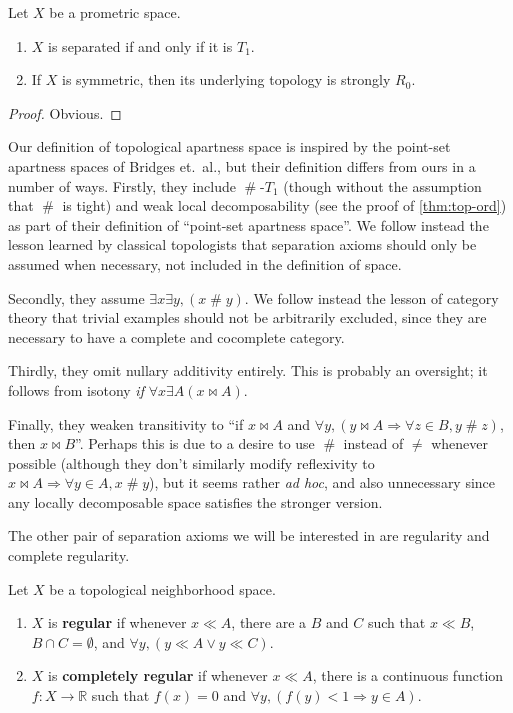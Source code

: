 \documentclass{article}
\def\R{\mathbb{R}}
\def\apart{\mathrel{\#}}
\let\implies\Rightarrow
\begin{document}
\begin{thm}
  Let $X$ be a prometric space.
  \begin{enumerate}
  \item $X$ is separated if and only if it is $T_1$.
  \item If $X$ is symmetric, then its underlying topology is strongly $R_0$.
  \end{enumerate}
\end{thm}
\begin{proof}
  Obvious.
\end{proof}

\begin{rmk}
  Our definition of topological apartness space is inspired by the point-set apartness spaces of Bridges et.~al., but their definition differs from ours in a number of ways.
  Firstly, they include $\apart$-$T_1$ (though without the assumption that $\apart$ is tight) and weak local decomposability (see the proof of \cref{thm:top-ord}) as part of their definition of ``point-set apartness space''.
  We follow instead the lesson learned by classical topologists that separation axioms should only be assumed when necessary, not included in the definition of space.
  
  Secondly, they assume $\exists x \exists y,(x\apart y)$.
  We follow instead the lesson of category theory that trivial examples should not be arbitrarily excluded, since they are necessary to have a complete and cocomplete category.

  Thirdly, they omit nullary additivity entirely.
  This is probably an oversight; it follows from isotony \emph{if} $\forall x \exists A(x\bowtie A)$.

  Finally, they weaken transitivity to ``if $x\bowtie A$ and $\forall y, (y\bowtie A \implies \forall z\in B, y\apart z)$, then $x\bowtie B$''.
  Perhaps this is due to a desire to use $\apart$ instead of $\neq$ whenever possible (although they don't similarly modify reflexivity to $x\bowtie A \implies \forall y\in A, x\apart y$), but it seems rather \emph{ad hoc}, and also unnecessary since any locally decomposable space satisfies the stronger version.
\end{rmk}

The other pair of separation axioms we will be interested in are regularity and complete regularity.

\begin{defn}
  Let $X$ be a topological neighborhood space.
  \begin{enumerate}
  \item $X$ is \textbf{regular} if whenever $x\ll A$, there are a $B$ and $C$ such that $x\ll B$, $B\cap C = \emptyset$, and $\forall y, (y\ll A \lor y\ll C)$.
  \item $X$ is \textbf{completely regular} if whenever $x\ll A$, there is a continuous function $f:X\to \R$ such that $f(x)=0$ and $\forall y, (f(y)<1 \implies y\in A)$.
  \end{enumerate}
\end{defn}
\end{document}
